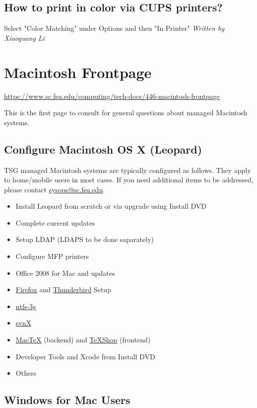 \documentclass[12pt,a4paper]{article}
\begin{document}
\subsection*{How to print in color via CUPS printers?}
Select "Color Matching" under Options and then "In Printer"
\hfill \textit{Written by Xiaoguang Li}

\section{Macintosh Frontpage}
\url{https://www.sc.fsu.edu/computing/tech-docs/446-macintosh-frontpage}

This is the first page to consult for general questions about managed Macintosh systems.

\subsection*{Configure Macintosh OS X (Leopard)}
TSG managed Macintosh systems are typically configured as follows. They apply to home/mobile users in most cases. If you need additional items to be addressed, please contact \href{mailto:sysops@sc.fsu.edu}{sysops@sc.fsu.edu}.
\begin{itemize}
    \item Install Leopard from scratch or via upgrade using Install DVD
    \item Complete current updates
    \item Setup LDAP (LDAPS to be done saparately)
    \item Configure MFP printers
    \item Office 2008 for Mac and updates
    \item \href{http://www.mozilla.com/en-US/firefox/}{Firefox} and \href{http://www.mozilla.com/en-US/thunderbird/}{Thunderbird} Setup
    \item \href{http://www.tuxera.com/mac/ntfs-3g_faq.html}{ntfs-3g}
    \item \href{http://www.macupdate.com/info.php/id/26105/svnx}{svnX}
    \item \href{http://www.tug.org/mactex/}{MacTeX} (backend) and \href{http://pages.uoregon.edu/koch/texshop/}{TeXShop} (frontend)
    \item Developer Tools and Xcode from Install DVD
    \item Others
\end{itemize}

\subsection*{Windows for Mac Users}
\end{document}
